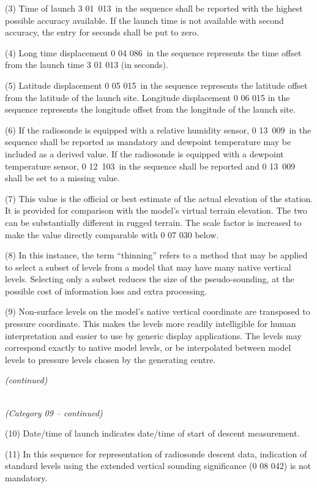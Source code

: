 (3) Time of launch 3 01~013~in the sequence shall be reported with the highest possible accuracy available. If the launch time is not available with second accuracy, the entry for seconds shall be put to zero.

(4) Long time displacement 0 04 086~in the sequence represents the time offset from the launch time 3 01 013 (in seconds).

(5) Latitude displacement 0 05 015~in the sequence represents the latitude offset from the latitude of the launch site. Longitude displacement 0 06 015 in the sequence represents the longitude offset from the longitude of the launch site.

(6) If the radiosonde is equipped with a relative humidity sensor, 0 13~009~in the sequence shall be reported as mandatory and dewpoint temperature may be included as a derived value. If the radiosonde is equipped with a dewpoint temperature sensor, 0 12~103~in the sequence shall be reported and 0 13~009 shall be set to a missing value.

(7) This value is the official or best estimate of the actual elevation of the station. It is provided for comparison with the model's virtual terrain elevation. The two can be substantially different in rugged terrain. The scale factor is increased to make the value directly comparable with 0 07 030 below.

(8) In this instance, the term ``thinning'' refers to a method that may be applied to select a subset of levels from a model that may have many native vertical levels. Selecting only a subset reduces the size of the pseudo-sounding, at the possible cost of information loss and extra processing.

(9) Non-surface levels on the model's native vertical coordinate are transposed to pressure coordinate. This makes the levels more readily intelligible for human interpretation and easier to use by generic display applications. The levels may correspond exactly to native model levels, or be interpolated between model levels to pressure levels chosen by the generating centre.

\emph{(continued)}

\emph{\\
(Category 09 -- continued)}

(10) Date/time of launch indicates date/time of start of descent measurement.

(11) In this sequence for representation of radiosonde descent data, indication of standard levels using the extended vertical sounding significance (0 08 042) is not mandatory.

